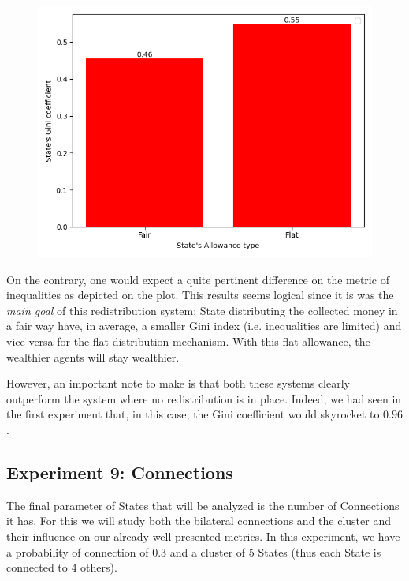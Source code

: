 {{{{{{{{{{{{{        \begin{figure}
            \includegraphics[width=\linewidth]{img/exp/8_3.png}
        \end{figure} 
        { On the contrary, one would expect a quite pertinent difference on the metric of inequalities as depicted on the plot. This results seems logical since it is was the \emph{main goal} of this redistribution system: State distributing the collected money in a fair way have, in average, a smaller Gini index (i.e. inequalities are limited) and vice-versa for the flat distribution mechanism. With this flat allowance, the wealthier agents will stay wealthier.

        However, an important note to make is that both these systems clearly outperform the system where no redistribution is in place. Indeed, we had seen in the first experiment that, in this case, the Gini coefficient would skyrocket to $0.96$.
        \par



    \subsection{Experiment 9: Connections}
    The final parameter of States that will be analyzed is the number of Connections it has. For this we will study both the bilateral connections and the cluster and their influence on our already well presented metrics. In this experiment, we have a probability of connection of 0.3 and a cluster of 5 States (thus each State is connected to 4 others).

}}}}}}}}}}}}}}
